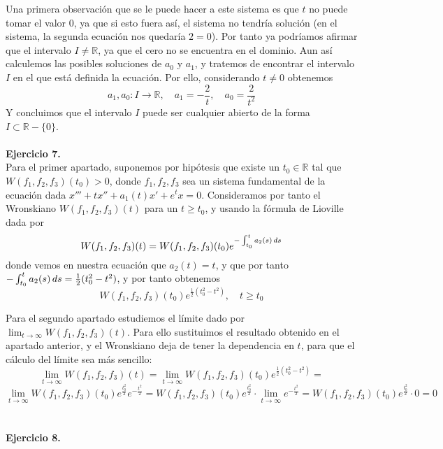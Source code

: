 \documentclass[fleqn]{article}
\def\R{\mathds{R}}
\begin{document}
    Una primera observación que se le puede hacer a este sistema es que $t$ no puede tomar el valor $0$, ya que si esto fuera así, el sistema no tendría
    solución (en el sistema, la segunda ecuación nos quedaría $2=0$). Por tanto ya podríamos afirmar que el intervalo $I\neq\R$, ya que el cero no se 
    encuentra en el dominio. Aun así calculemos las posibles soluciones de $a_0$ y $ a_1$, y tratemos de encontrar el intervalo $I$ en el que está 
    definida la ecuación. Por ello, considerando $t\neq 0$ obtenemos
    $$a_1,a_0: I \longrightarrow \R, \quad a_1=-\frac{2}{t}, \quad a_0=\frac{2}{t^2}$$
    Y concluimos que el intervalo $I$ puede ser cualquier abierto de la forma $I \subset \R - \{0\}$. \\ \\

    \textbf{Ejercicio 7.} \\

    Para el primer apartado, suponemos por hipótesis que existe un $t_0 \in \R$ tal que $W(f_1,f_2,f_3)(t_0) > 0$, donde ${f_1,f_2,f_3}$ sea un sistema fundamental
    de la ecuación dada $x''' + tx'' + a_1(t)x' + e^tx = 0$. Consideramos por tanto el Wronskiano  $W(f_1,f_2,f_3)(t)$ para un $t \geq t_0$, y usando la fórmula de 
    Lioville dada por
    $$W(f_1,f_2,f_3)(t) = W(f_1,f_2,f_3)(t_0) e^{-\int_{t_0}^t a_2(s)\thinspace ds}$$
    donde vemos en nuestra ecuación que $a_2(t)=t$, y que por tanto $-\int_{t_0}^t a_2(s)\thinspace ds = \frac{1}{2}(t_0^2 - t^2)$, y por tanto obtenemos
    $$W(f_1,f_2,f_3)(t_0) e^{\frac{1}{2}(t_0^2 - t^2)}, \quad t\geq t_0$$

    Para el segundo apartado estudiemos el límite dado por $\lim_{t\rightarrow\infty} W(f_1,f_2,f_3)(t)$. Para ello sustituimos el resultado obtenido en el apartado
    anterior, y el Wronskiano deja de tener la dependencia en $t$, para que el cálculo del límite sea más sencillo:
    $$\lim_{t\rightarrow\infty} W(f_1,f_2,f_3)(t) = \lim_{t\rightarrow\infty} W(f_1,f_2,f_3)(t_0)  e^{\frac{1}{2}(t_0^2 - t^2)} = $$
    $$\lim_{t\rightarrow\infty} W(f_1,f_2,f_3)(t_0) e^{\frac{t_0^2}{2}} e^{-\frac{t^2}{2}} = W(f_1,f_2,f_3)(t_0) e^{\frac{t_0^2}{2}} \cdot\lim_{t\rightarrow\infty}  e^{-\frac{t^2}{2}} =
    W(f_1,f_2,f_3)(t_0) e^{\frac{t_0^2}{2}} \cdot 0 = 0$$ \\ \\

    \textbf{Ejercicio 8.} \\
\end{document}
